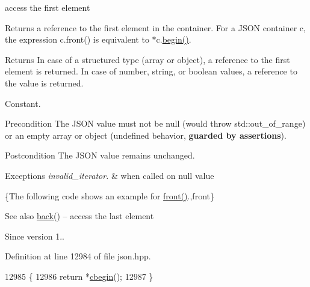 access the first element 

Returns a reference to the first element in the container. For a J\+S\+ON container {\ttfamily c}, the expression {\ttfamily c.\+front()} is equivalent to {\ttfamily $\ast$c.\hyperlink{classnlohmann_1_1basic__json_a0ff28dac23f2bdecee9564d07f51dcdc}{begin()}}.

\begin{DoxyReturn}{Returns}
In case of a structured type (array or object), a reference to the first element is returned. In case of number, string, or boolean values, a reference to the value is returned.
\end{DoxyReturn}
Constant.

\begin{DoxyPrecond}{Precondition}
The J\+S\+ON value must not be {\ttfamily null} (would throw {\ttfamily std\+::out\+\_\+of\+\_\+range}) or an empty array or object (undefined behavior, {\bfseries guarded by assertions}). 
\end{DoxyPrecond}
\begin{DoxyPostcond}{Postcondition}
The J\+S\+ON value remains unchanged.
\end{DoxyPostcond}

\begin{DoxyExceptions}{Exceptions}
{\em invalid\+\_\+iterator.} & when called on {\ttfamily null} value\\
\hline
\end{DoxyExceptions}
\{The following code shows an example for {\ttfamily \hyperlink{classnlohmann_1_1basic__json_a3acba9c6ceb7214e565fe08c3ba5b352}{front()}}.,front\}

\begin{DoxySeeAlso}{See also}
\hyperlink{classnlohmann_1_1basic__json_a011397134847f36db0ed7d7a93753677}{back()} -- access the last element
\end{DoxySeeAlso}
\begin{DoxySince}{Since}
version 1.. 
\end{DoxySince}


Definition at line 12984 of file json.\+hpp.


\begin{DoxyCode}
12985     \{
12986         \textcolor{keywordflow}{return} *\hyperlink{classnlohmann_1_1basic__json_ad865d6c291b237ae508d5cb2146b5877}{cbegin}();
12987     \}
\end{DoxyCode}
\mbox{\label{classnlohmann_1_1basic__json_a6b187a22994c12c8cae0dd5ee99dc85e}} 
